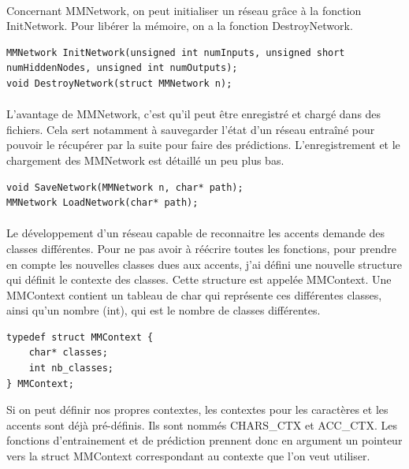 \documentclass{article}
\begin{document}
\paragraph{}Concernant MMNetwork, on peut initialiser un réseau grâce à la fonction InitNetwork.
Pour libérer la mémoire, on a la fonction DestroyNetwork.

\begin{lstlisting}
MMNetwork InitNetwork(unsigned int numInputs, unsigned short numHiddenNodes, unsigned int numOutputs);
void DestroyNetwork(struct MMNetwork n);

\end{lstlisting}

\paragraph{}L'avantage de MMNetwork, c'est qu'il peut être enregistré et chargé dans des fichiers. Cela sert notamment à sauvegarder l'état d'un réseau entraîné pour pouvoir le récupérer par la suite pour faire des prédictions. L'enregistrement et le chargement des MMNetwork est détaillé un peu plus bas.

\begin{lstlisting}
void SaveNetwork(MMNetwork n, char* path);
MMNetwork LoadNetwork(char* path);
\end{lstlisting}



\paragraph{}Le développement d’un réseau capable de reconnaitre les accents demande des classes différentes. Pour ne pas avoir à réécrire toutes les fonctions, pour prendre en compte les nouvelles classes dues aux accents, j’ai défini une nouvelle structure qui définit le contexte des classes. Cette structure est appelée MMContext. Une MMContext contient un tableau de char qui représente ces différentes classes, ainsi qu’un nombre (int), qui est le nombre de classes différentes.

\begin{lstlisting}
typedef struct MMContext {
	char* classes;
	int nb_classes;
} MMContext;		
\end{lstlisting}

Si on peut définir nos propres contextes, les contextes pour les caractères et les accents sont déjà pré-définis. Ils sont nommés CHARS\_CTX et ACC\_CTX.\newline
Les fonctions d’entrainement et de prédiction prennent donc en argument un pointeur vers la struct MMContext correspondant au contexte que l'on veut utiliser.
\end{document}
